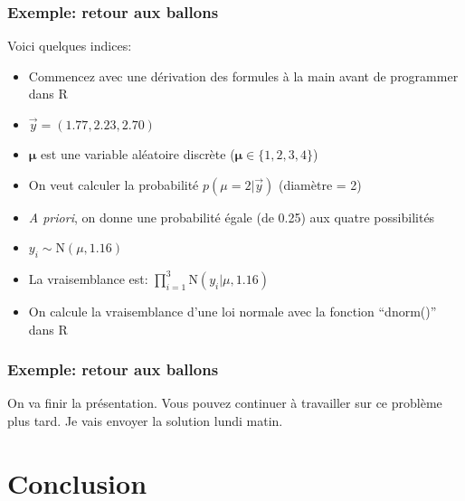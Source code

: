 \documentclass{beamer}
\begin{document}
\begin{frame}
    \frametitle{Exemple: retour aux ballons}
    Voici quelques indices:

    \vfill

    \begin{itemize}
      \item Commencez avec une dérivation des formules à la main avant de programmer dans R
      \item $\vec{y} = (1.77, 2.23, 2.70)$
      \item $\boldsymbol{\mu}$ est une variable aléatoire discrète ($\boldsymbol{\mu} \in \{1, 2, 3, 4\}$)
      \item On veut calculer la probabilité $p(\mu = 2 | \vec{y})$ (diamètre = 2)
      \item \emph{A priori}, on donne une probabilité égale (de 0.25) aux quatre possibilités
      \pause
      \item $y_i \sim \textrm{N}(\mu, 1.16)$
      \pause
      \item La vraisemblance est: $\prod_{i=1}^{3} \textrm{N}(y_i | \mu, 1.16)$
      \pause
      \item On calcule la vraisemblance d'une loi normale avec la fonction ``dnorm()'' dans R
    \end{itemize}
\end{frame}


\begin{frame}
    \frametitle{Exemple: retour aux ballons}
    On va finir la présentation. Vous pouvez continuer à travailler sur ce problème plus tard.
    Je vais envoyer la solution lundi matin.
\end{frame}


%
%
%
%
%



\section{Conclusion}
\end{document}
